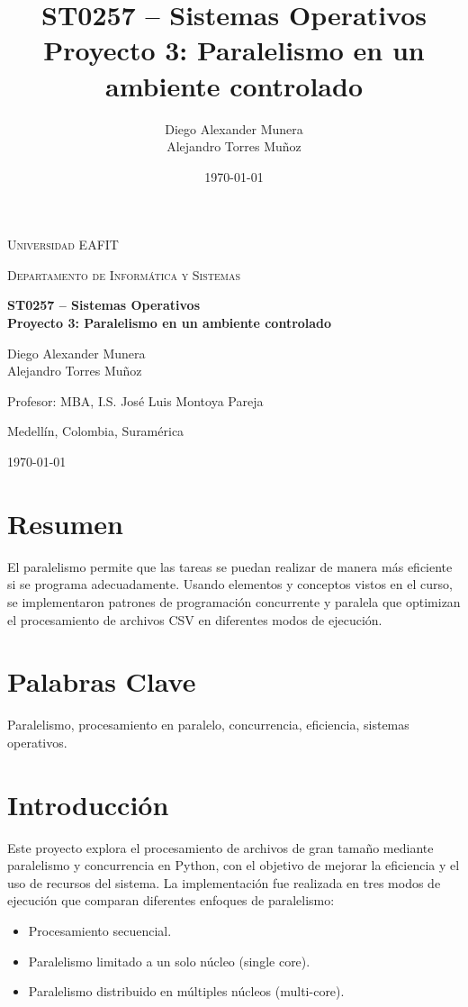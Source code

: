 \documentclass[a4paper,12pt]{report}
\title{ST0257 – Sistemas Operativos\\ Proyecto 3: Paralelismo en un ambiente controlado}
\author{Diego Alexander Munera \\ Alejandro Torres Muñoz}
\date{\today}
\begin{document}
\begin{titlepage}
    \centering
    {\scshape\LARGE Universidad EAFIT \par}
    \vspace{1cm}
    {\scshape\Large Departamento de Informática y Sistemas\par}
    \vspace{1.5cm}
    {\huge\bfseries ST0257 – Sistemas Operativos\\ Proyecto 3: Paralelismo en un ambiente controlado\par}
    \vspace{2cm}
    {\Large Diego Alexander Munera \\ Alejandro Torres Muñoz\par}
    \vspace{1cm}
    Profesor: MBA, I.S. José Luis Montoya Pareja\par
    \vfill
    Medellín, Colombia, Suramérica\par
    {\large \today\par}
\end{titlepage}

\tableofcontents
\newpage

\chapter*{Resumen}
El paralelismo permite que las tareas se puedan realizar de manera más eficiente si se programa adecuadamente. Usando elementos y conceptos vistos en el curso, se implementaron patrones de programación concurrente y paralela que optimizan el procesamiento de archivos CSV en diferentes modos de ejecución.

\chapter*{Palabras Clave}
Paralelismo, procesamiento en paralelo, concurrencia, eficiencia, sistemas operativos.

\chapter{Introducción}
Este proyecto explora el procesamiento de archivos de gran tamaño mediante paralelismo y concurrencia en Python, con el objetivo de mejorar la eficiencia y el uso de recursos del sistema. La implementación fue realizada en tres modos de ejecución que comparan diferentes enfoques de paralelismo: 
\begin{itemize}
    \item Procesamiento secuencial.
    \item Paralelismo limitado a un solo núcleo (single core).
    \item Paralelismo distribuido en múltiples núcleos (multi-core).
\end{itemize}
\end{document}
